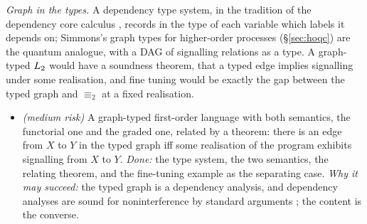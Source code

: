 \emph{Graph in the types.} A dependency type system, in the tradition of the dependency core calculus \cite{abadi1999dcc}, records in the type of each variable which labels it depends on; Simmons's graph types for higher-order processes (\S\ref{sec:hoqc}) are the quantum analogue, with a DAG of signalling relations as a type. A graph-typed $L_{2}$ would have a soundness theorem, that a typed edge implies signalling under some realisation, and fine tuning would be exactly the gap between the typed graph and $\equiv_2$ at a fixed realisation.
\begin{itemize}[nosep]
\item[C1] \textit{(medium risk)} A graph-typed first-order language with both semantics, the functorial one and the graded one, related by a theorem: there is an edge from $X$ to $Y$ in the typed graph iff some realisation of the program exhibits signalling from $X$ to $Y$. \emph{Done:} the type system, the two semantics, the relating theorem, and the fine-tuning example as the separating case. \emph{Why it may succeed:} the typed graph is a dependency analysis, and dependency analyses are sound for noninterference by standard arguments \cite{abadi1999dcc}; the content is the converse.
\end{itemize}


